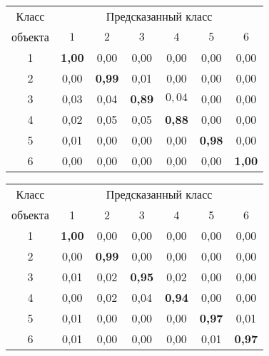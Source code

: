 \begin{table*}\small %
\begin{minipage}[t]{80mm}
\begin{center}
\vspace*{2ex}

\tabcolsep=6.4pt
\begin{tabular}{|c|c|c|c|c|c|c|}
\hline
Класс & \multicolumn{6}{c|}{Предсказанный класс} \\ 
  \cline{2-7}
объекта & $1$ & $2$ & $3$ & $4$ & $5$ & $6$\\ 
\hline
 1 & \textbf{1,00} & 0,00 & 0,00 & 0,00 & 0,00 & 0,00\\ 
 2 & 0,00 & \textbf{0,99} & 0,01 & 0,00 & 0,00 & 0,00\\ 
 3 & 0,03 & 0,04 & \textbf{0,89} & $0,04$ & 0,00 & 0,00\\ 
 4 & 0,02 & 0,05 & 0,05 & \textbf{0,88} & 0,00 & 0,00\\ 
 5 & 0,01 & 0,00 & 0,00 & 0,00 & \textbf{0,98} & 0,00\\ 
 6 & 0,00 & 0,00 & 0,00 & 0,00 & 0,00 & \textbf{1,00}\\ 
 \hline
\end{tabular}
\end{center}
\end{minipage}
\hfill
\begin{minipage}[t]{80mm}
\begin{center}
\vspace*{2ex}


\tabcolsep=6.5pt
\begin{tabular}{|c|c|c|c|c|c|c|}
\hline
Класс & \multicolumn{6}{c|}{Предсказанный класс} \\ 
  \cline{2-7}
объекта & 1 & 2 & 3 & 4 & 5 & 6\\ 
  \hline
 1 & \textbf{1,00} & 0,00 & 0,00 & 0,00 & 0,00 & 0,00\\ 
 2 & 0,00 & \textbf{0,99} & 0,00 & 0,00 & 0,00 & 0,00\\ 
 3 & 0,01 & 0,02 & \textbf{0,95} & 0,02 & 0,00 & 0,00\\ 
 4 & 0,00 & 0,02 & 0,04 & \textbf{0,94} & 0,00 & 0,00\\ 
 5 & 0,01 & 0,00 & 0,00 & 0,00 & \textbf{0,97} & 0,01\\ 
 6 & 0,01 & 0,00 & 0,00 & 0,00 & 0,01 & \textbf{0,97}\\ 
\hline
\end{tabular}
\end{center}
\end{minipage}
\end{table*}


